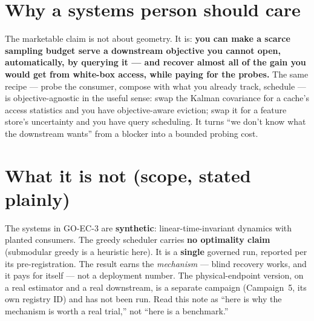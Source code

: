 \documentclass[11pt]{article}
\begin{document}
\section*{Why a systems person should care}

The marketable claim is not about geometry. It is: \textbf{you can make a
scarce sampling budget serve a downstream objective you cannot open,
automatically, by querying it --- and recover almost all of the gain you
would get from white-box access, while paying for the probes.} The same
recipe --- probe the consumer, compose with what you already track,
schedule --- is objective-agnostic in the useful sense: swap the Kalman
covariance for a cache's access statistics and you have objective-aware
eviction; swap it for a feature store's uncertainty and you have
query scheduling. It turns ``we don't know what the downstream wants''
from a blocker into a bounded probing cost.

\section*{What it is not (scope, stated plainly)}

The systems in GO-EC-3 are \textbf{synthetic}: linear-time-invariant
dynamics with planted consumers. The greedy scheduler carries \textbf{no
optimality claim} (submodular greedy is a heuristic here). It is a
\textbf{single} governed run, reported per its pre-registration. The
result earns the \emph{mechanism} --- blind recovery works, and it pays
for itself --- not a deployment number. The physical-endpoint version,
on a real estimator and a real downstream, is a separate campaign
(Campaign~5, its own registry ID) and has not been run. Read this note as
``here is why the mechanism is worth a real trial,'' not ``here is a
benchmark.''
\end{document}

